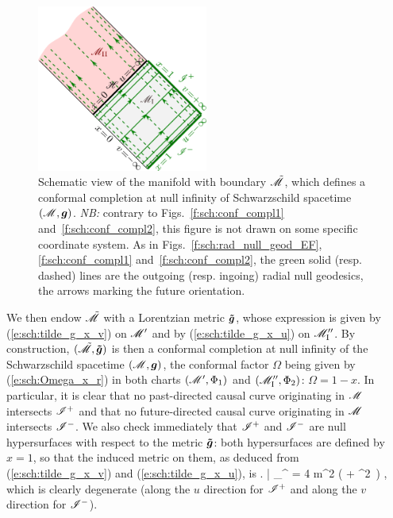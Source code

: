 \begin{figure}
\centerline{\includegraphics[width=0.5\textwidth]{sch_conf_compl_final.pdf}}
\caption[]{\label{f:sch:conf_compl_final} \footnotesize
Schematic view of the manifold with boundary $\tilde{\mathscr{M}}$, which defines
a conformal completion at null infinity of Schwarzschild spacetime
$(\mathscr{M},\bm{g})$.
\textsl{NB:} contrary to Figs.~\ref{f:sch:conf_compl1} and~\ref{f:sch:conf_compl2}, this figure is not drawn on some specific coordinate system.
As in Figs.~\ref{f:sch:rad_null_geod_EF}, \ref{f:sch:conf_compl1} and~\ref{f:sch:conf_compl2},
the green solid (resp. dashed) lines are the outgoing (resp. ingoing) radial null geodesics, the arrows marking the future orientation.
}
\end{figure}


We then endow $\tilde{\mathscr{M}}$ with a Lorentzian metric $\bm{\tilde{g}}$, whose
expression is given by (\ref{e:sch:tilde_g_x_v}) on $\mathscr{M}'$ and
by (\ref{e:sch:tilde_g_x_u}) on $\mathscr{M}''_{\rm I}$.
By construction, $(\tilde{\mathscr{M}},\bm{\tilde{g}})$ is then a conformal completion at null
infinity of the Schwarzschild spacetime $(\mathscr{M},\bm{g})$, the conformal factor
$\Omega$ being given by (\ref{e:sch:Omega_x_r}) in both
charts $(\mathscr{M}',\Phi_1)$ and $(\mathscr{M}''_{\rm I},\Phi_2)$: $\Omega = 1 -x$.
In particular, it is clear that no past-directed causal curve originating in
$\mathscr{M}$ intersects $\mathscr{I}^+$ and that no future-directed causal curve originating in
$\mathscr{M}$ intersects $\mathscr{I}^-$. We also check immediately that $\mathscr{I}^+$ and $\mathscr{I}^-$
are null hypersurfaces with respect to the metric $\bm{\tilde{g}}$:
both hypersurfaces are defined by $x=1$, so that the induced metric on them,
as
deduced from (\ref{e:sch:tilde_g_x_v}) and
(\ref{e:sch:tilde_g_x_u}), is
\be
    \left.  \right| _{\scri^\pm} = 4 m^2 \left(
        \dd \th\otimes \dd \th + \sin^2\th \, \dd \ph \otimes \dd \ph \right) ,
\ee
which is clearly degenerate (along the $u$ direction for $\mathscr{I}^+$
and along the $v$ direction for $\mathscr{I}^-$).

